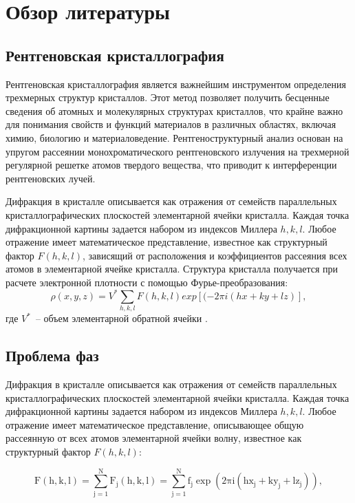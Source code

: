 \section{Обзор литературы}

\subsection{Рентгеновская кристаллография}


Рентгеновская кристаллография является важнейшим инструментом определения трехмерных структур кристаллов. Этот метод позволяет получить бесценные сведения об атомных и молекулярных структурах кристаллов, что крайне важно для понимания свойств и функций материалов в различных областях, включая химию, биологию и материаловедение. Рентгеноструктурный анализ основан на упругом рассеянии монохроматического рентгеновского излучения на трехмерной регулярной решетке атомов твердого вещества, что приводит к интерференции рентгеновских лучей.

Дифракция в кристалле описывается как отражения от семейств параллельных кристаллографических плоскостей элементарной ячейки кристалла. Каждая точка дифракционной картины задается набором из индексов Миллера $h,k,l$. Любое отражение имеет математическое представление, известное как структурный фактор $F(h,k,l)$, зависящий от расположения и коэффициентов рассеяния всех
атомов в элементарной ячейке кристалла. Структура кристалла получается при расчете электронной плотности с помощью Фурье-преобразования: \[\rho(x, y, z) = V^*\sum_{h,k,l} F(h,k,l) exp[(-2\pi i (hx+ky+lz)],\] где $V^*$~-- объем элементарной обратной ячейки \cite{giro}. 

\subsection{Проблема фаз}

Дифракция в кристалле описывается как отражения от семейств параллельных кристаллографических плоскостей элементарной ячейки кристалла. Каждая точка дифракционной картины задается набором из индексов Миллера $h,k,l$. Любое отражение имеет математическое представление, описывающее общую рассеянную от всех атомов элементарной ячейки волну, известное как структурный фактор $F(h,k,l)$:

\begin{equation}\label{eq1}
\mathrm{ 
F(h,k,l) = \sum\limits_{j=1}^N F_j (h,k,l) = \sum\limits_{j=1}^N f_j \exp(2\pi i(hx_j+ky_j+lz_j)),}
\end{equation}

